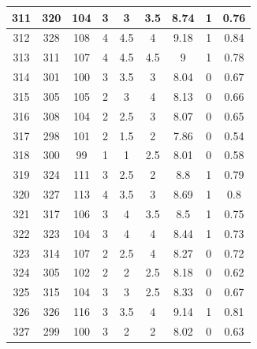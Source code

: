 \documentclass[11pt]{article}
\begin{document}
\begin{appendix}
\begin{longtable}[H]{|c|c|c|c|c|c|c|c|c|}
	311        & 320       & 104         & 3                 & 3   & 3.5 & 8.74 & 1        & 0.76            \\ \hline
	312        & 328       & 108         & 4                 & 4.5 & 4   & 9.18 & 1        & 0.84            \\ \hline
	313        & 311       & 107         & 4                 & 4.5 & 4.5 & 9    & 1        & 0.78            \\ \hline
	314        & 301       & 100         & 3                 & 3.5 & 3   & 8.04 & 0        & 0.67            \\ \hline
	315        & 305       & 105         & 2                 & 3   & 4   & 8.13 & 0        & 0.66            \\ \hline
	316        & 308       & 104         & 2                 & 2.5 & 3   & 8.07 & 0        & 0.65            \\ \hline
	317        & 298       & 101         & 2                 & 1.5 & 2   & 7.86 & 0        & 0.54            \\ \hline
	318        & 300       & 99          & 1                 & 1   & 2.5 & 8.01 & 0        & 0.58            \\ \hline
	319        & 324       & 111         & 3                 & 2.5 & 2   & 8.8  & 1        & 0.79            \\ \hline
	320        & 327       & 113         & 4                 & 3.5 & 3   & 8.69 & 1        & 0.8             \\ \hline
	321        & 317       & 106         & 3                 & 4   & 3.5 & 8.5  & 1        & 0.75            \\ \hline
	322        & 323       & 104         & 3                 & 4   & 4   & 8.44 & 1        & 0.73            \\ \hline
	323        & 314       & 107         & 2                 & 2.5 & 4   & 8.27 & 0        & 0.72            \\ \hline
	324        & 305       & 102         & 2                 & 2   & 2.5 & 8.18 & 0        & 0.62            \\ \hline
	325        & 315       & 104         & 3                 & 3   & 2.5 & 8.33 & 0        & 0.67            \\ \hline
	326        & 326       & 116         & 3                 & 3.5 & 4   & 9.14 & 1        & 0.81            \\ \hline
	327        & 299       & 100         & 3                 & 2   & 2   & 8.02 & 0        & 0.63            \\ \hline

\end{longtable}
\end{appendix}
\end{document}
